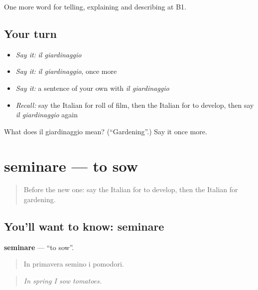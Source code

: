 \begin{grammarlens}[title={What you've built}]
One more word for telling, explaining and describing at B1.
\end{grammarlens}

\subsection*{Your turn}
\begin{itemize}
\raggedright
  \item \emph{Say it:} \emph{il giardinaggio}
  \item \emph{Say it:} \emph{il giardinaggio}, once more
  \item \emph{Say it:} a sentence of your own with \emph{il giardinaggio}
  \item \emph{Recall:} say the Italian for roll of film, then the Italian for to develop, then say \emph{il giardinaggio} again
\end{itemize}

\begin{tcolorbox}[breakable,colback=teal!4,colframe=teal!35!black,title={Before you move on}]
What does il giardinaggio mean? (\textquotedblleft{}Gardening\textquotedblright{}.) Say it once more.
\end{tcolorbox}
\section[seminare]{seminare — to sow}

\label{lesson:IT-C507-seminare}



\begin{quote}
Before the new one: say the Italian for to develop, then the Italian for gardening.
\end{quote}

\subsection*{You'll want to know: seminare}
\textbf{seminare} — \textquotedblleft{}to sow\textquotedblright{}.

\begin{quote}
In primavera semino i pomodori.
\end{quote}

\begin{quote}
\emph{In spring I sow tomatoes.}
\end{quote}

